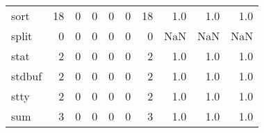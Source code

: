 \begin{tabular}{lrrrrrrrrr}
sort      &                                      18 &                                                  0 &                                                  0 &                                                  0 &                                                  0 &                                                 18 &                                                1.0 &                                    1.0 &                                  1.0 \\
split     &                                       0 &                                                  0 &                                                  0 &                                                  0 &                                                  0 &                                                  0 &                                                NaN &                                    NaN &                                  NaN \\
stat      &                                       2 &                                                  0 &                                                  0 &                                                  0 &                                                  0 &                                                  2 &                                                1.0 &                                    1.0 &                                  1.0 \\
stdbuf    &                                       2 &                                                  0 &                                                  0 &                                                  0 &                                                  0 &                                                  2 &                                                1.0 &                                    1.0 &                                  1.0 \\
stty      &                                       2 &                                                  0 &                                                  0 &                                                  0 &                                                  0 &                                                  2 &                                                1.0 &                                    1.0 &                                  1.0 \\
sum       &                                       3 &                                                  0 &                                                  0 &                                                  0 &                                                  0 &                                                  3 &                                                1.0 &                                    1.0 &                                  1.0 \\

\end{tabular}
